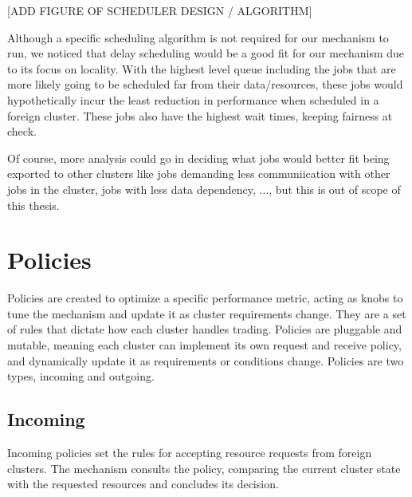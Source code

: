 [ADD FIGURE OF SCHEDULER DESIGN / ALGORITHM]

Although a specific scheduling algorithm is not required for our mechanism to
run, we noticed that delay scheduling would be a good fit for our mechanism due
to its focus on locality. With the highest level queue including the jobs that
are more likely going to be scheduled far from their data/resources, these jobs
would hypothetically incur the least reduction in performance when scheduled in
a foreign cluster. These jobs also have the highest wait times, keeping
fairness at check. 

Of course, more analysis could go in deciding what jobs would better fit being
exported to other clusters like jobs demanding less communiication with other
jobs in the cluster, jobs with less data dependency, ..., but this is out of
scope of this thesis.


\section{Policies}

Policies are created to optimize a specific performance metric, acting as knobs
to tune the mechanism and update it as cluster requirements change. They are a
set of rules that dictate how each cluster handles trading. Policies are
pluggable and mutable, meaning each cluster can implement its own request and
receive policy, and dynamically update it as requirements or conditions change.
Policies are two types, incoming and outgoing. 

\subsection{Incoming} 

Incoming policies set the rules for accepting resource requests from foreign
clusters. The mechanism consults the policy, comparing the current cluster
state with the requested resources and concludes its decision.


